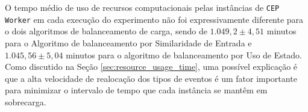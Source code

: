 
O tempo médio de uso de recursos computacionais pelas instâncias de \texttt{CEP Worker} em cada execução do experimento não foi expressivamente diferente para o dois algoritmos de balanceamento de carga, sendo de  $1.049,2 \pm 4,51$ minutos para o Algoritmo de balanceamento por Similaridade de Entrada e $1.045,56 \pm 5,04$ minutos para o algoritmo de balanceamento por Uso de Estado. Como discutido na Seção \ref{sec:resource_usage_time}, uma possível explicação é que a alta velocidade de realocação dos tipos de eventos é um fator importante para minimizar o intervalo de tempo que cada instância se mantêm em sobrecarga. 






